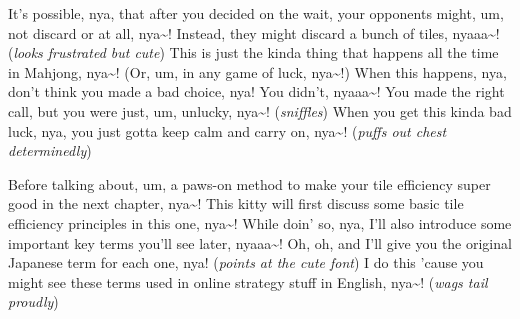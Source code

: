 \bigskip

It’s possible, nya, that after you decided on the {}
wait, your opponents might, um, not discard {} or {}
at all, nya\textasciitilde! Instead, they might discard a bunch of {}
tiles, nyaaa\textasciitilde! (\textit{looks frustrated but cute}) This is just the kinda
thing that happens all the time in Mahjong, nya\textasciitilde! (Or, um, in any game of
luck, nya\textasciitilde!) When this happens, nya, don’t think you made a bad choice, nya!
You didn’t, nyaaa\textasciitilde! You made the right call, but you were just, um, unlucky,
nya\textasciitilde! (\textit{sniffles}) When you get this kinda bad luck, nya, you just gotta
keep calm
and carry on, nya\textasciitilde! (\textit{puffs out chest determinedly})

\bigskip

Before talking about, um, a paws-on method to make your tile efficiency
super good in the next chapter, nya\textasciitilde! This kitty will first discuss some basic
tile efficiency principles in this one, nya\textasciitilde! While doin’ so, nya, I’ll also
introduce some important key terms you’ll see later, nyaaa\textasciitilde! Oh, oh, and I’ll
give you the original Japanese term for each one, nya! (\textit{points at the cute
font}) I do this 'cause you might see these terms used in online strategy
stuff in English, nya\textasciitilde! (\textit{wags tail proudly})

